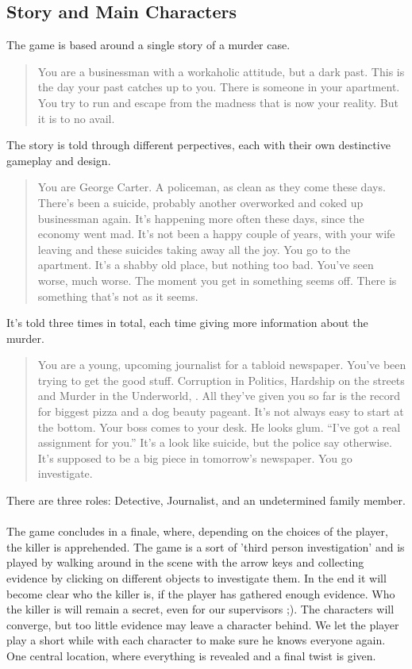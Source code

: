 \documentclass{article}
\begin{document}
	\subsection{Story and Main Characters}
		The game is based around a single story of a murder case. 
		\begin{quote}
			You are a businessman with a workaholic attitude, but a dark past. This is the day your past catches up to you. There is someone in your apartment. You try to run and escape from the madness that is now your reality. But it is to no avail.
		\end{quote}
		The story is told through different perpectives, each with their own destinctive gameplay and design. 
		\begin{quote}
			You are George Carter. A policeman, as clean as they come these days. There’s been a suicide, probably another overworked and coked up businessman again. It’s happening more often these days, since the economy went mad. It’s not been a happy couple of years, with your wife leaving and these suicides taking away all the joy. You go to the apartment. It’s a shabby old place, but nothing too bad. You’ve seen worse, much worse. The moment you get in something seems off. There is something that’s not as it seems.
		\end{quote}
		It's told three times in total, each time giving more information about the murder. 
		\begin{quote}
			You are a young, upcoming journalist for a tabloid newspaper. You’ve been trying to get the good stuff. Corruption in Politics, Hardship on the streets and Murder in the Underworld, . All they’ve given you so far is the record for biggest pizza and a dog beauty pageant. It’s not always easy to start at the bottom. Your boss comes to your desk. He looks glum. “I’ve got a real assignment for you.” It’s a look like suicide, but the police say otherwise. It’s supposed to be a big piece in tomorrow’s newspaper. You go investigate.
		\end{quote}
		There are three roles: Detective, Journalist, and an undetermined family member.\\ \\
		\noindent
		The game concludes in a finale, where, depending on the choices of the player, the killer is apprehended. The game is a sort of 'third person investigation' and is played by walking around in the scene with the arrow keys and collecting evidence by clicking on different objects to investigate them. In the end it will become clear who the killer is, if the player has gathered enough evidence. Who the killer is will remain a secret, even for our supervisors ;). The characters will converge, but too little evidence may leave a character behind. We let the player play a short while with each character to make sure he knows everyone again. One central location, where everything is revealed and a final twist is given. \\ \\
\end{document}
